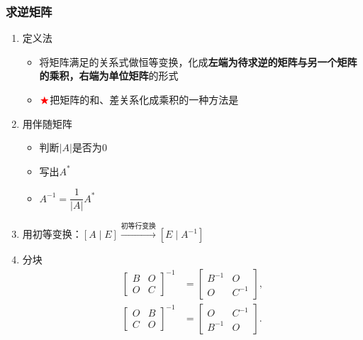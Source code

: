 \documentclass[./linear_algebra.tex]{subfiles}
\begin{document}
    \subsubsection{求逆矩阵}

    \begin{enumerate}
        \item 定义法
        \begin{itemize}
            \item 将矩阵满足的关系式做恒等变换，化成\textbf{左端为待求逆的矩阵与另一个矩阵的乘积，右端为单位矩阵}的形式
            \item $\color{red}{\bigstar}$把矩阵的和、差关系化成乘积的一种方法是{\color{red}{提取公因子}}
        \end{itemize}
        \item 用伴随矩阵
        \begin{itemize}
            \item 判断$|A|$是否为$0$
            \item 写出$A^*$
            \item $A^{-1} = \dfrac{1}{|A|}A^*$
        \end{itemize}
        \item 用初等变换：$[A \mid E] \xrightarrow{\text{初等行变换}} [E \mid A^{-1}]$
        \item 分块
        \begin{align*}
            \begin{bmatrix}
                B & O \\
                O & C
            \end{bmatrix}^{-1}
            &=
            \begin{bmatrix}
                B^{-1} & O      \\
                O      & C^{-1}
            \end{bmatrix}, \\[2mm]
%
            \begin{bmatrix}
                O & B \\
                C & O
            \end{bmatrix}^{-1}
            &=
            \begin{bmatrix}
                O      & C^{-1} \\
                B^{-1} & O
            \end{bmatrix}.
        \end{align*}
    \end{enumerate}
\end{document}
